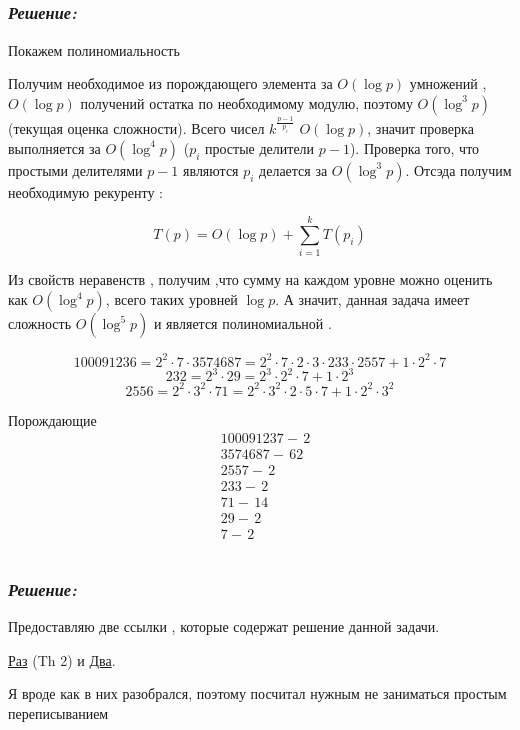 \documentclass[a4paper, 11pt]{article} %
\newcommand*\circled[1]{\tikz[baseline=(char.base)]{
            \node[shape=circle,draw,inner sep=2pt] (char) {#1};}}
\begin{document}
\subsection*{\circled{5}} 
\subsubsection*{\textit{Решение:}}
\par Покажем полиномиальность 
\par Получим необходимое из порождающего элемента за  $O(\log{p})$ умножений , $O(\log{p})$ получений остатка по необходимому модулю,  
поэтому $O(\log^3{p})$(текущая оценка сложности). Всего чисел $k^{\frac{p-1}{p_i}}$ $O(\log{p})$, значит проверка выполняется за $O(\log^4{p})$ ($p_i$ простые делители $p-1$). Проверка того, что простыми делителями $p-1$ являются $p_i$ делается за $O(\log^3{p})$. Отсэда получим необходимую рекуренту :

\[T(p) = O(\log{p}) + \sum_{i=1}^k T(p_i)\]

Из свойств неравенств , получим ,что сумму на каждом уровне можно оценить как $O(\log^4{p})$, всего таких уровней $\log{p}$. А значит, данная задача имеет сложность  $O(\log^5{p})$ и является полиномиальной .

\[100091236 = 2^2 \cdot 7 \cdot 3574687 = 2^2 \cdot 7 \cdot 2 \cdot 3 \cdot 233 \cdot 2557 + 1 \cdot 2^2 \cdot 7 \]
\[232 = 2^3 \cdot 29 =2^3 \cdot 2^2 \cdot 7 + 1 \cdot 2^3 \]
\[2556 = 2^2 \cdot 3^2 \cdot 71 = 2^2 \cdot 3^2 \cdot 2 \cdot 5 \cdot 7 + 1 \cdot 2^2 \cdot 3^2 \]

Порождающие 
\begin{align*}
&100091237 -\, 2\\
&3574687 - \,62\\
&2557 -\, 2\\
&233 -\, 2\\
&71 -\, 14\\
&29 -\, 2\\
&7 -\, 2\\
\end{align*} 

\subsection*{\circled{6}} 
\subsubsection*{\textit{Решение:}}
\par Предоставляю две ссылки , которые содержат решение данной задачи.   \par\href{https://bit.ly/2SBvEmS}{Раз} (Th 2) и  \href{https://bit.ly/2Xwzy45}{Два}. \par Я вроде как в них разобрался, поэтому посчитал нужным не заниматься простым переписыванием 
\end{document}

